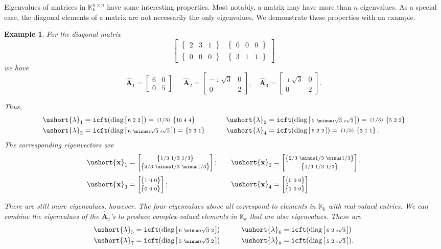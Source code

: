 \documentclass[1p,authoryear,letterpaper]{elsarticle}
\newtheorem{example}[theorem]{Example}
\providecommand{\ii}{\imath}
\providecommand{\KK}{\mathbb{K}}
\providecommand{\bmat}[1]{\begin{bmatrix} #1 \end{bmatrix}}
\providecommand{\sbmat}[1]{\left[\begin{smallmatrix} #1 \end{smallmatrix}\right]}
\providecommand{\mat}{\boldsymbol}
\renewcommand{\vec}{\mathbf}
\providecommand{\mhat}[1]{\ensuremath{\mat{\hat{#1}}}}
\providecommand{\mAhat}{\mhat{A}}
\DeclareMathOperator{\ifft}{\texttt{icft}}
\newcommand{\cel}[1]{\ushort{#1}}
\newcommand{\csbmat}[1]{\left\{\! \begin{smallmatrix} #1
\end{smallmatrix} \! \right\}}
\newcommand{\smallmath}[1]{\begin{smallmatrix}#1\end{smallmatrix}}
\newcommand{\celv}[1]{\cel{\vec{#1}}}
\newcommand{\clambda}{\ensuremath{\cel{\lambda}}}
\newcommand{\cvx}{\ensuremath{\celv{x}}}
\begin{document}
Eigenvalues of matrices in $\KK_k^{n \times n}$ have some
interesting properties. Most notably, a matrix may have more than $n$
eigenvalues. As a special case, the diagonal elements of a
matrix are not necessarily the only eigenvalues.  We demonstrate
these properties with an example.
\begin{example} \label{ex:diag-evals}
 For the diagonal matrix
  \begin{equation*}
    \bmat{ \csbmat{2 & 3 & 1} & \csbmat{0 & 0 & 0} \\
           \csbmat{0 & 0 & 0} & \csbmat{3 & 1 & 1} }
  \end{equation*}
  we have
  \[ \mAhat_1 = \bmat{6 & 0\\0 & 5}, \quad
   \mAhat_2 = \bmat{\minus\ii \sqrt{3} & 0 \\ 0 & 2}, \quad
   \mAhat_3 = \bmat{\ii \sqrt{3} & 0 \\ 0 & 2}. \]





Thus,
\[
\begin{aligned}
\clambda_1 & = \ifft(\diag\sbmat{6 & 2 & 2}) = \smallmath{(1/3)} \csbmat{10 & 4 & 4}&
 \qquad
\clambda_2 & = \ifft(\diag\sbmat{5 & \minus\ii \sqrt{3} & \ii\sqrt{3}}) = \smallmath{(1/3)}\csbmat{5 & 2 & 2} \\
\clambda_3 & = \ifft(\diag\sbmat{6 & \minus\ii \sqrt{3} & \ii\sqrt{3}}) = \csbmat{2 & 3 & 1} &
\qquad
\clambda_4 & = \ifft(\diag\sbmat{5 & 2 & 2}) = \smallmath{(1/3)}\csbmat{3 & 1 & 1}. \\
\end{aligned}
 \]
 The corresponding eigenvectors are
  \[
  \begin{array}{l@{\qquad}l}
       \cvx_1 = \bmat{\csbmat{ 1/3 & 1/3 & 1/3} \\ \csbmat{ 2/3 & \minus1/3 &\minus1/3} } ;
     &
      \cvx_2 = \bmat{\csbmat{ 2/3 & \minus 1/3 & \minus 1/3 } \\ \csbmat{1/3 & 1/3 & 1/3} } ;
     \\[3ex]
       \cvx_3 = \bmat{\csbmat{1 & 0 & 0} \\ \csbmat{0 & 0 & 0}} ;
     &
      \cvx_4 = \bmat{\csbmat{0 & 0 & 0} \\ \csbmat{1 & 0 & 0}}.
  \end{array}
  \]





There are still more eigenvalues, however.  The four eigenvalues above all
correspond to elements in $\KK_k$ with real-valued entries.
We can combine the eigenvalues of the $\mAhat_j$'s to produce
complex-valued elements in $\KK_k$ that are also eigenvalues.
These are
\[
\begin{aligned}
\clambda_5 & = \ifft(\diag\sbmat{6 & \minus\ii\sqrt{3} & 2}) &
 \qquad
\clambda_6 & = \ifft(\diag\sbmat{6 & 2 & \ii\sqrt{3}}) \\
\clambda_7 & = \ifft(\diag\sbmat{5 & \minus\ii \sqrt{3} & 2}) &
\qquad
\clambda_8 & = \ifft(\diag\sbmat{5 & 2 & \ii \sqrt{3}}). \\
\end{aligned}
 \]




\end{example}
\end{document}
